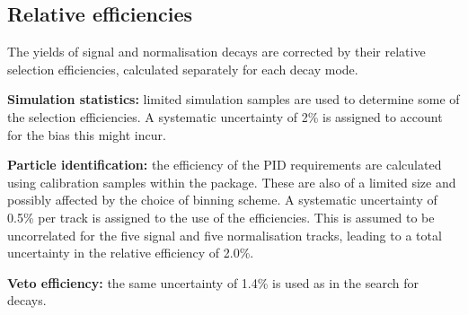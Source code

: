 \subsection{Relative efficiencies}
The yields of signal and normalisation decays are corrected by their relative selection efficiencies, calculated separately for each \Dsp decay mode. 

\begin{description}
\item \textbf{Simulation statistics:} limited simulation samples are used to determine some of the selection efficiencies. A systematic uncertainty of 2\% is assigned to account for the bias this might incur. 

\item \textbf{Particle identification:} the efficiency of the PID requirements are calculated using calibration samples within the \pidcalib package. These are also of a limited size and possibly affected by the choice of binning scheme. 
A systematic uncertainty of 0.5\% per track is assigned to the use of the \pidcalib efficiencies. This is assumed to be uncorrelated for the five signal and five normalisation tracks, leading to a total uncertainty in the relative efficiency of 2.0\%. 

\item \textbf{Veto efficiency:} the same uncertainty of 1.4\% is used as in the search for \decay{\Bp}{\Dsp\Kp\Km} decays.


\end{description}
